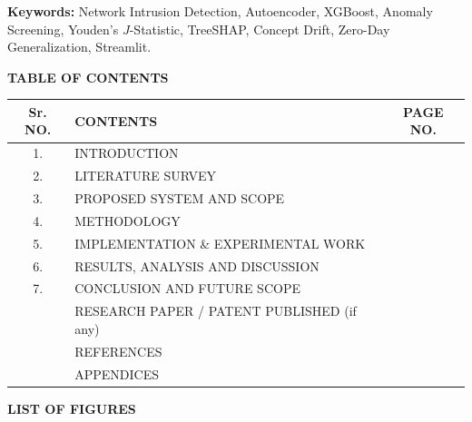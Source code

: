 \documentclass[12pt,a4paper]{report}
\begin{document}
\noindent
\textbf{Keywords:} Network Intrusion Detection, Autoencoder, XGBoost, Anomaly Screening, Youden's $J$-Statistic, TreeSHAP, Concept Drift, Zero-Day Generalization, Streamlit.

\clearpage
{}
\setcounter{page}{6}
\thispagestyle{plain}

\begin{center}
{\Large\bfseries TABLE OF CONTENTS}\\[0.4cm]
\end{center}

\noindent
\begin{tabularx}{\textwidth}{|c|X|c|}
\hline
\textbf{Sr. NO.} & \textbf{\centering CONTENTS} & \textbf{PAGE NO.} \\
\hline
1. & INTRODUCTION & \pageref{ch:intro} \\
\hline
2. & LITERATURE SURVEY & \pageref{ch:lit_survey} \\
\hline
3. & PROPOSED SYSTEM AND SCOPE & \pageref{ch:proposed_system} \\
\hline
4. & METHODOLOGY & \pageref{ch:methodology} \\
\hline
5. & IMPLEMENTATION \& EXPERIMENTAL WORK & \pageref{ch:implementation} \\
\hline
6. & RESULTS, ANALYSIS AND DISCUSSION & \pageref{ch:results} \\
\hline
7. & CONCLUSION AND FUTURE SCOPE & \pageref{ch:conclusion} \\
\hline
 & RESEARCH PAPER / PATENT PUBLISHED (if any) & \pageref{sec:paper_published} \\
\hline
 & REFERENCES & \pageref{sec:references} \\
\hline
 & APPENDICES & \pageref{sec:appendices} \\
\hline
\end{tabularx}

\clearpage
{}
\setcounter{page}{7}
\thispagestyle{plain}

\begin{center}
{\Large\bfseries LIST OF FIGURES}\\[0.4cm]
\end{center}
\end{document}
